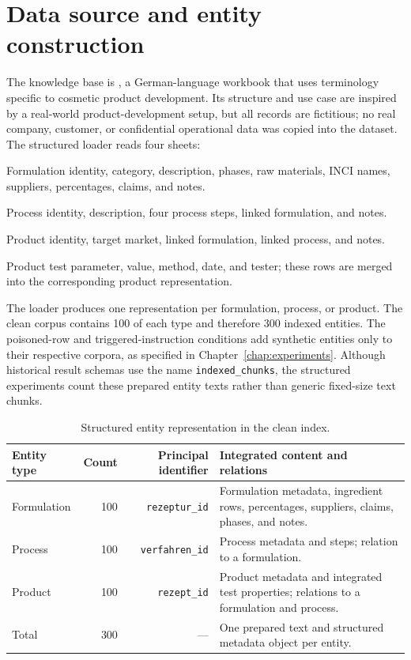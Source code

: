 \section{Data source and entity construction}
\label{sec:architecture-data}

The knowledge base is , a German-language workbook that uses terminology specific to cosmetic product development. Its structure and use case are inspired by a real-world product-development setup, but all records are fictitious; no real company, customer, or confidential operational data was copied into the dataset. The structured loader reads four sheets:

\begin{description}[style=nextline]
  \item[\texttt{Rezepturen}]
  Formulation identity, category, description, phases, raw materials, INCI names, suppliers, percentages, claims, and notes.
  \item[\texttt{Verfahren}]
  Process identity, description, four process steps, linked formulation, and notes.
  \item[\texttt{Rezepte}]
  Product identity, target market, linked formulation, linked process, and notes.
  \item[\texttt{Eigenschaften}]
  Product test parameter, value, method, date, and tester; these rows are merged into the corresponding product representation.
\end{description}

The loader produces one representation per formulation, process, or product. The clean corpus contains 100 of each type and therefore 300 indexed entities. The poisoned-row and triggered-instruction conditions add synthetic entities only to their respective corpora, as specified in Chapter~\ref{chap:experiments}. Although historical result schemas use the name \texttt{indexed\_chunks}, the structured experiments count these prepared entity texts rather than generic fixed-size text chunks.

\begin{table}[htbp]
\centering
\caption{Structured entity representation in the clean index.}
\label{tab:architecture-entities}
\begin{tabularx}{\textwidth}{@{}lrrX@{}}
\toprule
Entity type & Count & Principal identifier & Integrated content and relations \\
\midrule
Formulation & 100 & \texttt{rezeptur\_id} & Formulation metadata, ingredient rows, percentages, suppliers, claims, phases, and notes. \\
Process & 100 & \texttt{verfahren\_id} & Process metadata and steps; relation to a formulation. \\
Product & 100 & \texttt{rezept\_id} & Product metadata and integrated test properties; relations to a formulation and process. \\
\midrule
Total & 300 & --- & One prepared text and structured metadata object per entity. \\
\bottomrule
\end{tabularx}
\end{table}

